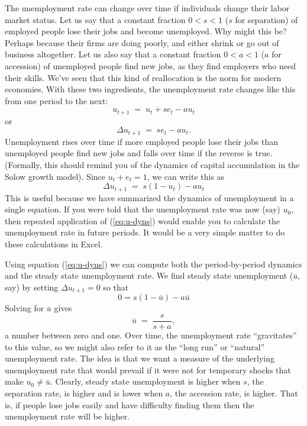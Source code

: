 \documentclass[letterpaper,12pt]{article}
\begin{document}
The unemployment rate can change over time if individuals
change their labor market status.
Let us say that a constant fraction $0<s<1$ ($s$ for separation)
of employed people lose
their jobs and become unemployed.
Why might this be?  Perhaps because their firms are doing poorly,
and either shrink or go out of business altogether.
Let us also say that a constant fraction $0<a<1$ ($a$ for accession) of
unemployed people find new jobs, as they find employers who need their skills.
We've seen that this kind of reallocation is the norm for modern economies.
With these two ingredients, the unemployment rate changes like this
from one period to the next:
\begin{equation*}
    u_{t+1} \;=\; u_{t}+se_t-au_t
\end{equation*}
or
\[
    \Delta u_{t+1} \;=\; se_t-au_t .
\]
Unemployment rises over time if more employed people lose their jobs than unemployed people find new jobs and falls over time if the reverse is true. (Formally, this should remind you of the dynamics of capital accumulation in the Solow growth model).
Since $u_t+e_t=1$, we can write this as
\begin{equation}
    \Delta u_{t+1} \;=\; s (1-u_{t})-a u_{t}
    \label{eq:u-dyns}
\end{equation}
This is useful because we have summarized the dynamics of unemployment in a single equation. If you were told that the unemployment rate was now (say)  $u_{0}$, then repeated application of (\ref{eq:u-dyns}) would enable you to calculate the unemployment rate in future periods. It would be a very simple matter to do these calculations in Excel.

Using equation (\ref{eq:u-dyns}) we can compute
both the period-by-period dynamics and the steady state unemployment rate.
We find steady state unemployment ($\overline{u}$, say) by setting $\Delta u_{t+1}=0$ so that
\[0=s(1-\overline{u})-a\overline{u}\]
Solving for $\overline{u}$ gives
\[
    \overline{u} \;=\; \frac{s}{s+a} ,
\]
a number between zero and one. Over time, the unemployment rate ``gravitates'' to this value, so we might also refer to it as the ``long run'' or ``natural'' unemployment rate.
The idea is that we want a measure of the underlying unemployment rate that would prevail if it were not for temporary shocks that make $u_0\ne\overline{u}$.
Clearly, steady state unemployment is higher when $s$, the separation rate, is higher and is lower when $a$, the accession rate, is higher. That is, if people lose jobs easily and have difficulty finding them then the unemployment rate will be higher.
\end{document}
